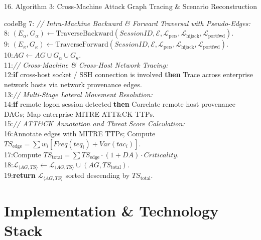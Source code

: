 \documentclass[aspectratio=169,10pt]{beamer}
\begin{document}
\begin{frame}{16. Algorithm 3: Cross-Machine Attack Graph Tracing \& Scenario Reconstruction}
\begin{beamercolorbox}[rounded=true,shadow=false,sep=0.20em,wd=0.98\textwidth]{codeBg}
{7: \quad \textit{// Intra-Machine Backward \& Forward Traversal with Pseudo-Edges:}\\
8: \quad $(E_\alpha, G_\alpha) \leftarrow \text{TraverseBackward}(SessionID, \mathcal{E}, \mathcal{L}_{\text{pers}}, \mathcal{L}_{\text{hijack}}, \mathcal{L}_{\text{portfwd}})$.\\
9: \quad $(E_\kappa, G_\kappa) \leftarrow \text{TraverseForward}(SessionID, \mathcal{E}, \mathcal{L}_{\text{pers}}, \mathcal{L}_{\text{hijack}}, \mathcal{L}_{\text{portfwd}})$.\\
10:\quad $AG \leftarrow AG \cup G_\alpha \cup G_\kappa$.\\
11:\quad \textit{// Cross-Machine \& Cross-Host Network Tracing:}\\
12:\quad \textbf{if} cross-host socket / SSH connection is involved \textbf{then} Trace across enterprise network hosts via network provenance edges.\\
13:\quad \textit{// Multi-Stage Lateral Movement Resolution:}\\
14:\quad \textbf{if} remote logon session detected \textbf{then} Correlate remote host provenance DAGs; Map enterprise MITRE ATT\&CK TTPs.\\
15:\quad \textit{// ATT\&CK Annotation and Threat Score Calculation:}\\
16:\quad Annotate edges with MITRE TTPs; Compute $TS_{\text{edge}} = \sum w_i [Freq(teq_i) + Var(tac_i)]$.\\
17:\quad Compute $TS_{\text{total}} = \sum TS_{\text{edge}} \cdot (1 + DA) \cdot Criticality$.\\
18:\quad $\mathcal{L}_{\langle AG, TS \rangle} \leftarrow \mathcal{L}_{\langle AG, TS \rangle} \cup (AG, TS_{\text{total}})$.\\
19:\textbf{return} $\mathcal{L}_{\langle AG, TS \rangle}$ sorted descending by $TS_{\text{total}}$.
}
\end{beamercolorbox}
\end{frame}


\section{Implementation \& Technology Stack}
\end{document}
